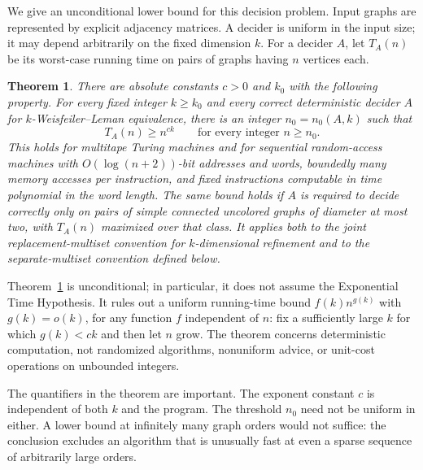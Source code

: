 \documentclass[11pt]{article}
\newtheorem{theorem}{Theorem}[section]
\theoremstyle{definition}
\theoremstyle{remark}
\numberwithin{equation}{section}
\begin{document}
We give an unconditional lower bound for this decision problem. Input graphs are represented
by explicit adjacency matrices. A decider is uniform
in the input size; it may depend arbitrarily on the fixed dimension
$k$. For a decider $A$, let $T_A(n)$ be its worst-case running time on
pairs of graphs having $n$ vertices each.

\begin{theorem}\label{thm:main}
There are absolute constants $c>0$ and $k_0$ with the following
property. For every fixed integer $k\ge k_0$ and every correct
deterministic decider $A$ for $k$-Weisfeiler--Leman equivalence, there
is an integer $n_0=n_0(A,k)$ such that
\[
                     T_A(n)\ge n^{ck}
             \qquad\text{for every integer }n\ge n_0.
\]
This holds for multitape Turing machines and for sequential
random-access machines with $O(\log(n+2))$-bit addresses and words,
boundedly many memory accesses per instruction, and fixed instructions
computable in time polynomial in the word length.
The same bound holds if $A$ is required to decide correctly only on
pairs of simple connected uncolored graphs of diameter at most two,
with $T_A(n)$ maximized over that class. It applies both to the
joint replacement-multiset convention for $k$-dimensional refinement
and to the separate-multiset convention defined below.
\end{theorem}

Theorem~\ref{thm:main} is unconditional; in particular, it does not
assume the Exponential Time Hypothesis. It rules out a uniform
running-time bound $f(k)n^{g(k)}$ with $g(k)=o(k)$, for any
function $f$ independent of $n$: fix a sufficiently large $k$ for
which $g(k)<ck$ and then let $n$ grow. The theorem concerns
deterministic computation, not randomized algorithms, nonuniform
advice, or unit-cost operations on unbounded integers.

The quantifiers in the theorem are important. The exponent constant $c$
is independent of both $k$ and the program. The threshold $n_0$ need not
be uniform in either. A lower bound at infinitely many graph orders would
not suffice: the conclusion excludes an algorithm that is unusually fast
at even a sparse sequence of arbitrarily large orders.
\end{document}

